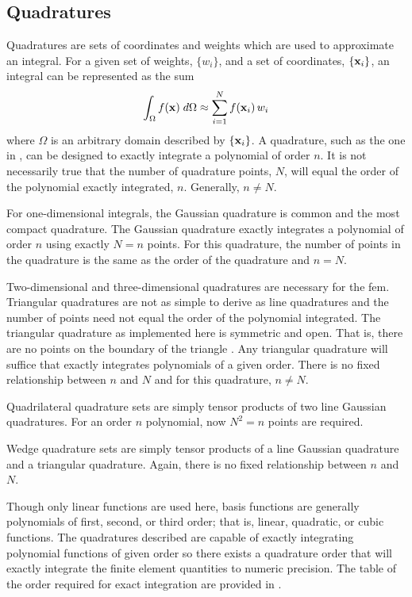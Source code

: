   \subsection{Quadratures}
    \label{sec:quadratures}
    Quadratures are sets of coordinates and weights which are used to
    approximate an integral.  For a given set of weights, $\{w_i\}$, and a set
    of coordinates, $\{\mathbf{x}_i\}$, an integral can be represented as the sum
    \begin{equation}
      \label{eq:quadrature}
      \int_{\Omega} f(\mathbf{x}) \;d\Omega \approx \sum_{i=1}^{N} f(\mathbf{x}_i) \, w_i 
    \end{equation}
    where $\Omega$ is an arbitrary domain described by $\{\mathbf{x}_i\}$.  A
    quadrature, such as the one in , can be designed to
    exactly integrate a polynomial of order $n$. It is not necessarily true that
    the number of quadrature points, $N$, will equal the order of the polynomial
    exactly integrated, $n$. Generally, $n \ne N$.
    
    For one-dimensional integrals, the Gaussian quadrature is common and the most compact quadrature. The Gaussian quadrature exactly integrates a 
    polynomial of order $n$ using exactly $N=n$ points. For this quadrature, the
    number of points in the quadrature is the same as the order of the
    quadrature and $n=N$.
    
    Two-dimensional and three-dimensional quadratures are necessary for the 
    \gls{fem}. Triangular quadratures are not as simple to derive
    as line quadratures and the number of points need not equal the order of the
    polynomial integrated. The triangular quadrature as implemented here is 
    symmetric and open. That is, there are no points on the boundary of the 
    triangle \cite{triangleQuadrature}. Any triangular quadrature will suffice
    that exactly integrates polynomials of a given order. There is no fixed
    relationship between $n$ and $N$ and for this quadrature, $n \ne N$.
    
    Quadrilateral quadrature sets are simply tensor products of two line 
    Gaussian quadratures. For an order $n$ polynomial, now $N^2=n$ points are 
    required. 
    
    Wedge quadrature sets are simply tensor products of a line Gaussian 
    quadrature and a triangular quadrature. Again, there is no fixed
    relationship between $n$ and $N$.
    
    Though only linear functions are used here, basis functions are generally
    polynomials of first, second, or third order; that is, linear, quadratic, or
    cubic functions. The quadratures described are capable of exactly
    integrating polynomial functions of given order so there exists a quadrature
    order that will exactly integrate the finite element quantities to numeric
    precision. The table of the order required for exact integration are
    provided in .

